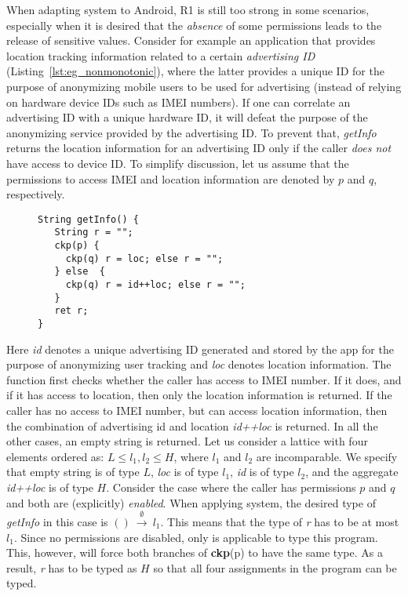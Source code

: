 When adapting {\BN} system to Android, R1
is still too strong in some scenarios, especially when it is desired that the \emph{absence} of some permissions
leads to the release of sensitive values. Consider for example an application
that provides location tracking information related to a certain
{\em advertising ID} (Listing~\ref{lst:eg_nonmonotonic}), where the latter provides a unique ID for the purpose of anonymizing mobile users
to be used for advertising (instead of relying on hardware device IDs such
as IMEI numbers). If one can correlate an advertising
ID with a unique hardware ID, it will defeat the purpose of
the anonymizing service provided by the advertising ID. To prevent
that, \textit{getInfo} returns the location information for an advertising ID
only if the caller \emph{does not} have access to device ID.
To simplify discussion, let us assume that the permissions to access
IMEI and location information are denoted by $p$ and $q$, respectively.
\begin{figure}[ht]
\begin{lstlisting}[caption={An example about non-monotonic policy.}, label={lst:eg_nonmonotonic}]
String getInfo() {
   String r = "";
   ckp(p) {
     ckp(q) r = loc; else r = "";
   } else  {
     ckp(q) r = id++loc; else r = "";
   }
   ret r;
}
\end{lstlisting}
\end{figure}
Here \textit{id} denotes a unique advertising ID  generated and stored by the app for
the purpose of anonymizing user tracking and \textit{loc} denotes location
information.
The function first checks whether the caller has access to IMEI number.
If it does, and if it has access to location, then only the location information is returned.
If the caller has no access to IMEI number, but can access location information,
then the combination of advertising id and location \textit{id++loc} is returned.
In all the other cases, an empty string is returned.
Let us consider a lattice with four elements ordered as:
$L \leq l_1, l_2 \leq H$, where $l_1$ and $l_2$ are incomparable. We specify that empty string is of type $L$, \textit{loc} is of type $l_1$,
\textit{id} is of type $l_2$, and the aggregate \textit{id++loc} is of type $H.$
Consider the case where the caller has permissions $p$ and $q$ and both are (explicitly) \emph{enabled}.
When applying {\BN} system, the desired type of \textit{getInfo} in this case is  $()~{\xrightarrow{~\emptyset~}}~l_1$.
This means that the type of \textit{r} has to be at most $l_1$.
Since no permissions are disabled, only  is applicable
to type this program. This, however, will force both branches of \textbf{ckp}(p)
to have the same type. As a result, \textit{r}
has to be typed as $H$ so that all four assignments in the program
can be typed.

